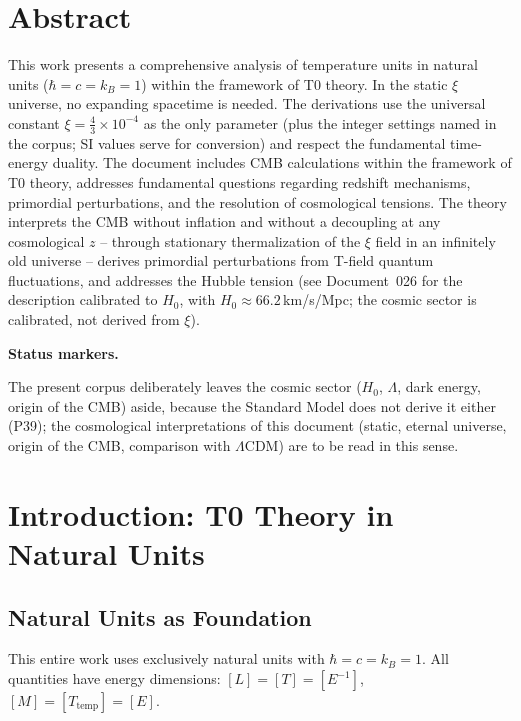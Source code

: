 \section*{Abstract}
		This work presents a comprehensive analysis of temperature units in natural units ($\hbar = c = k_B = 1$) within the framework of T0 theory. In the static $\xi$ universe, no expanding spacetime is needed. The derivations use the universal constant $\xi = \frac{4}{3} \times 10^{-4}$ as the only parameter (plus the integer settings named in the corpus; SI values serve for conversion) and respect the fundamental time-energy duality. The document includes CMB calculations within the framework of T0 theory, addresses fundamental questions regarding redshift mechanisms, primordial perturbations, and the resolution of cosmological tensions. The theory interprets the CMB without inflation and without a decoupling at any cosmological $z$ -- through stationary thermalization of the $\xi$ field in an infinitely old universe -- derives primordial perturbations from T-field quantum fluctuations, and addresses the Hubble tension (see Document~026 for the description calibrated to $H_0$, with $H_0 \approx 66.2\,$km/s/Mpc; the cosmic sector is calibrated, not derived from $\xi$).

	\medskip\noindent\textbf{Status markers.}
	

	\noindent The present corpus deliberately leaves the cosmic sector ($H_0$, $\Lambda$, dark energy, origin of the CMB) aside, because the Standard Model does not derive it either (P39); the cosmological interpretations of this document (static, eternal universe, origin of the CMB, comparison with $\Lambda$CDM) are to be read in this sense.

	
	
	\section{Introduction: T0 Theory in Natural Units}
	
	\subsection{Natural Units as Foundation}
	
	\begin{important}
		This entire work uses exclusively natural units with $\hbar = c = k_B = 1$. All quantities have energy dimensions: $[L] = [T] = [E^{-1}]$, $[M] = [T_{\text{temp}}] = [E]$.
	\end{important}
	
